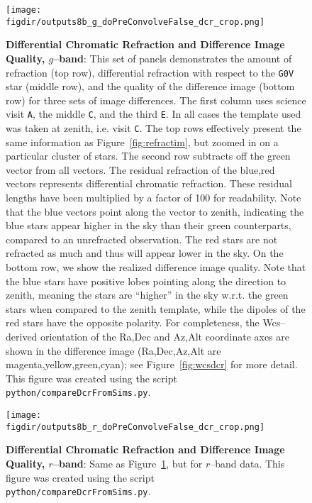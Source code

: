 \documentclass[prd, nofootinbib, floatfix, 11pt, tightenlines, times]{article}
\def\figdir{../figures}
\def\A{{\tt A}}
\def\C{{\tt C}}
\def\E{{\tt E}}
\begin{document}
\begin{appendices}
\begin{figure}[!ht]
  \centering
  \texttt{[image: \\figdir/outputs8b\_g\_doPreConvolveFalse\_dcr\_crop.png]}
  \caption{{\bf Differential Chromatic Refraction and Difference Image
      Quality, $g$--band}: This set of panels demonstrates the amount
    of refraction (top row), differential refraction with respect to
    the {\tt G0V} star (middle row), and the quality of the difference
    image (bottom row) for three sets of image differences.  The first
    column uses science visit \A, the middle \C, and the third \E.  In
    all cases the template used was taken at zenith, i.e. visit \C.
    The top rows effectively present the same information as
    Figure~\ref{fig:refractim}, but zoomed in on a particular cluster
    of stars.  The second row subtracts off the green vector from all
    vectors.  The residual refraction of the blue,red vectors
    represents differential chromatic refraction.  These residual
    lengths have been multiplied by a factor of 100 for readability.
    Note that the blue vectors point along the vector to zenith,
    indicating the blue stars appear higher in the sky than their
    green counterparts, compared to an unrefracted observation.  The
    red stars are not refracted as much and thus will appear lower in
    the sky.  On the bottom row, we show the realized difference image
    quality.  Note that the blue stars have positive lobes pointing
    along the direction to zenith, meaning the stars are ``higher'' in
    the sky w.r.t. the green stars when compared to the zenith
    template, while the dipoles of the red stars have the opposite
    polarity.  For completeness, the Wcs--derived orientation of the
    Ra,Dec and Az,Alt coordinate axes are shown in the difference
    image (Ra,Dec,Az,Alt are magenta,yellow,green,cyan); see
    Figure~\ref{fig:wcsdcr} for more detail.  This figure was created
    using the script {\tt python/compareDcrFromSims.py}.}
  \label{fig:dcrimg}
\end{figure}

\begin{figure}[!ht]
  \centering
  \texttt{[image: \\figdir/outputs8b\_r\_doPreConvolveFalse\_dcr\_crop.png]}
  \caption{{\bf Differential Chromatic Refraction and Difference Image
      Quality, $r$--band}: Same as Figure~\ref{fig:dcrimg}, but for
    $r$--band data.  This figure was created using the script {\tt
      python/compareDcrFromSims.py}.}
  \label{fig:dcrimr}
\end{figure}


\end{appendices}
\end{document}
